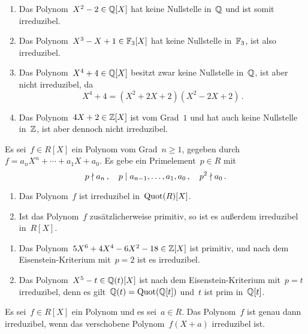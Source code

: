 \begin{example}
  \leavevmode
  \begin{enumerate}
    \item
      Das Polynom~$X^2 - 2 \in \mathbb{Q}[X]$ hat keine Nullstelle in~$\mathbb{Q}$ und ist somit irreduzibel.
    \item
      Das Polynom~$X^3 - X + 1 \in \mathbb{F}_3[X]$ hat keine Nullstelle in~$\mathbb{F}_3$, ist also irreduzibel.
    \item
      Das Polynom~$X^4 + 4 \in \mathbb{Q}[X]$ besitzt zwar keine Nullstelle in~$\mathbb{Q}$, ist aber nicht irreduzibel, da
      \[
        X^4 + 4
        =
        (X^2 + 2X + 2) (X^2 - 2X + 2) \,.
      \]
    \item
      Das Polynom~$4X + 2 \in \mathbb{Z}[X]$ ist vom Grad~$1$ und hat auch keine Nullstelle in~$\mathbb{Z}$, ist aber dennoch nicht irreduzibel.
  \end{enumerate}
\end{example}

\begin{proposition}
  Es sei~$f \in R[X]$ ein Polynom vom Grad~$n \geq 1$, gegeben durch~$f = a_n X^n + \dotsb + a_1 X + a_0$.
  Es gebe ein Primelement~$p \in R$ mit
  \[
    p \nmid a_n \,,
    \quad
    p \mid a_{n-1}, \dotsc, a_1, a_0 \,,
    \quad
    p^2 \nmid a_0 \,.
  \]
  \begin{enumerate}
    \item
      Das Polynom~$f$ ist irreduzibel in~$\operatorname{Quot}(R)[X]$.
    \item
      Ist das Polynom~$f$ zusätzlicherweise primitiv, so ist es außerdem irreduzibel in~$R[X]$.
  \end{enumerate}
\end{proposition}

\begin{example}
  \leavevmode
  \begin{enumerate}
    \item
      Das Polynom~$5X^6 + 4 X^4 - 6 X^2 - 18 \in \mathbb{Z}[X]$ ist primitiv, und nach dem Eisenstein-Kriterium mit~$p = 2$ ist es irreduzibel.
    \item
      Das Polynom~$X^5 - t \in \mathbb{Q}(t)[X]$ ist nach dem Eisenstein-Kriterium mit~$p = t$ irreduzibel, denn es gilt~$\mathbb{Q}(t) = \operatorname{Quot}(\mathbb{Q}[t])$ und~$t$ ist prim in~$\mathbb{Q}[t]$.
  \end{enumerate}
\end{example}

\begin{proposition}
  Es sei~$f \in R[X]$ ein Polynom und es sei~$a \in R$.
  Das Polynom~$f$ ist genau dann irreduzibel, wenn das verschobene Polynom~$f(X + a)$ irreduzibel ist.
\end{proposition}

